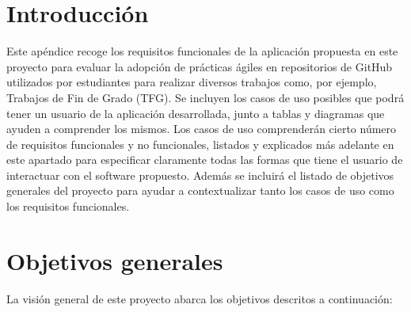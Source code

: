 
\section{Introducción}

Este apéndice recoge los requisitos funcionales de la aplicación propuesta en este proyecto para evaluar la adopción de prácticas ágiles en repositorios de GitHub utilizados por estudiantes para realizar diversos trabajos como, por ejemplo, Trabajos de Fin de Grado (TFG). Se incluyen los casos de uso posibles que podrá tener un usuario de la aplicación desarrollada, junto a tablas y diagramas que ayuden a comprender los mismos. Los casos de uso comprenderán cierto número de requisitos funcionales y no funcionales, listados y explicados más adelante en este apartado para especificar claramente todas las formas que tiene el usuario de interactuar con el software propuesto. Además se incluirá el listado de objetivos generales del proyecto para ayudar a contextualizar tanto los casos de uso como los requisitos funcionales.

\section{Objetivos generales}
La visión general de este proyecto abarca los objetivos descritos a continuación:

